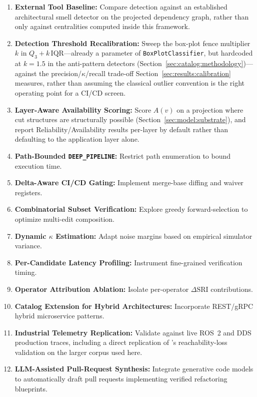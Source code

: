 \begin{enumerate}
    \item \textbf{External Tool Baseline:} Compare detection against an established architectural smell detector \citep{arcan2017, sharma2016designite} on the projected dependency graph, rather than only against centralities computed inside this framework.
    \item \textbf{Detection Threshold Recalibration:} Sweep the box-plot fence multiplier $k$ in $Q_3 + k\,\mathrm{IQR}$---already a parameter of \texttt{BoxPlotClassifier}, but hardcoded at $k=1.5$ in the anti-pattern detectors (Section~\ref{sec:catalog:methodology})---against the precision/$\kappa$/recall trade-off Section~\ref{sec:results:calibration} measures, rather than assuming the classical outlier convention is the right operating point for a CI/CD screen.
    \item \textbf{Layer-Aware Availability Scoring:} Score $A(v)$ on a projection where cut structures are structurally possible (Section~\ref{sec:model:substrate}), and report Reliability/Availability results per-layer by default rather than defaulting to the application layer alone.
    \item \textbf{Path-Bounded \texttt{DEEP\_PIPELINE}:} Restrict path enumeration to bound execution time.
    \item \textbf{Delta-Aware CI/CD Gating:} Implement merge-base diffing and waiver registers.
    \item \textbf{Combinatorial Subset Verification:} Explore greedy forward-selection to optimize multi-edit composition.
    \item \textbf{Dynamic $\kappa$ Estimation:} Adapt noise margins based on empirical simulator variance.
    \item \textbf{Per-Candidate Latency Profiling:} Instrument fine-grained verification timing.
    \item \textbf{Operator Attribution Ablation:} Isolate per-operator $\Delta\mathrm{SRI}$ contributions.
    \item \textbf{Catalog Extension for Hybrid Architectures:} Incorporate REST/gRPC hybrid microservice patterns.
    \item \textbf{Industrial Telemetry Replication:} Validate against live ROS~2 and DDS production traces, including a direct replication of \citep{yigit2025graph}'s reachability-loss validation on the larger corpus used here.
    \item \textbf{LLM-Assisted Pull-Request Synthesis:} Integrate generative code models to automatically draft pull requests implementing verified refactoring blueprints.
\end{enumerate}
